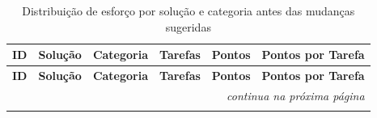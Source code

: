 	\begin{longtable}{cccccc}
		\label{tab:esforco_solucoes_historico} \\
		\toprule
		\textbf{ID} & \textbf{Solução} & \textbf{Categoria} & \textbf{Tarefas} & \textbf{Pontos} & \textbf{Pontos por Tarefa} \\
		\midrule
		\endfirsthead

		\toprule
		\textbf{ID} & \textbf{Solução} & \textbf{Categoria} & \textbf{Tarefas} & \textbf{Pontos} & \textbf{Pontos por Tarefa} \\
		\midrule
		\endhead

		\midrule
		\multicolumn{6}{r}{\textit{continua na próxima página}} \\
		\midrule
		\endfoot

		\bottomrule
		\caption{Distribuição de esforço por solução e categoria antes das mudanças sugeridas}
		\endlastfoot


\end{longtable}
